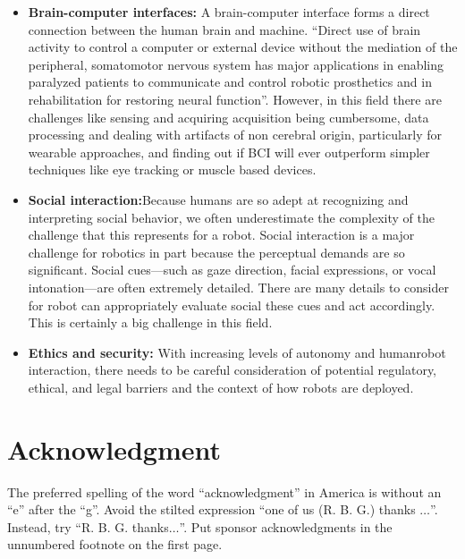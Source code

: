 \documentclass[conference]{IEEEtran}
\begin{document}
\begin{itemize}
\item \textbf{Brain-computer interfaces:} A brain-computer interface forms a direct connection between the human brain and machine. ``Direct use of brain activity to control a computer or external device without the mediation of the peripheral, somatomotor nervous system has major applications in enabling paralyzed patients to communicate and control robotic prosthetics and in rehabilitation for restoring neural function''\autocite{yang2018grand}. However, in this field there are challenges like sensing and acquiring acquisition being cumbersome, data processing and dealing with artifacts of non cerebral origin, particularly for wearable approaches, and finding out if BCI will ever outperform simpler techniques like eye tracking or muscle based devices.
\item \textbf{Social interaction:}Because humans are so adept at recognizing and interpreting social behavior, we often underestimate the complexity of the challenge that this represents for a robot. Social interaction is a major challenge for robotics in part because the perceptual demands are so significant. Social cues—such as gaze direction, facial expressions, or vocal intonation—are often extremely detailed. There are many details to consider for robot can appropriately evaluate social these cues and act accordingly. This is certainly a big challenge in this field.
\item \textbf{Ethics and security:} With increasing levels of autonomy and humanrobot interaction, there needs to be careful consideration of potential regulatory, ethical, and legal barriers and the context of how robots are deployed.
\end{itemize}

\section*{Acknowledgment}

The preferred spelling of the word ``acknowledgment'' in America is without 
an ``e'' after the ``g''. Avoid the stilted expression ``one of us (R. B. 
G.) thanks $\ldots$''. Instead, try ``R. B. G. thanks$\ldots$''. Put sponsor 
acknowledgments in the unnumbered footnote on the first page.

\newpage{}
\printbibliography{}
\end{document}
